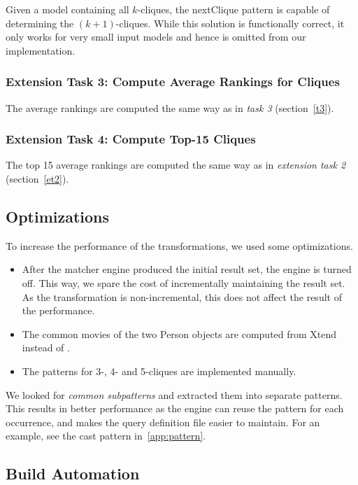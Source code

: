 Given a model containing all $k$-cliques, the \textsf{nextClique} pattern is capable of determining the $(k+1)$-cliques. While this solution is functionally correct, it only works for very small input models and hence is omitted from our implementation.

\subsubsection{Extension Task 3: Compute Average Rankings for Cliques}
\label{et3}

The average rankings are computed the same way as in \emph{task 3} (section~\ref{t3}).

\subsubsection{Extension Task 4: Compute Top-15 Cliques}
\label{et4}

The top 15 average rankings are computed the same way as in \emph{extension task 2} (section~\ref{et2}).

\subsection{Optimizations}

To increase the performance of the transformations, we used some optimizations.

\begin{itemize}
  \item After the matcher engine produced the initial result set, the engine is turned off. This way, we spare the cost of incrementally maintaining the result set. As the transformation is non-incremental, this does not affect the result of the performance. 
  \item The common movies of the two \textsf{Person} objects are computed from Xtend instead of \incquery{}.
  \item The patterns for 3-, 4- and 5-cliques are implemented manually.
\end{itemize}
 
We looked for \emph{common subpatterns} and extracted them into separate patterns. This results in better performance as the engine can reuse the pattern for each occurrence, and makes the query definition file easier to maintain. For an example, see the \textsf{cast} pattern in~\ref{app:pattern}.

\subsection{Build Automation}

